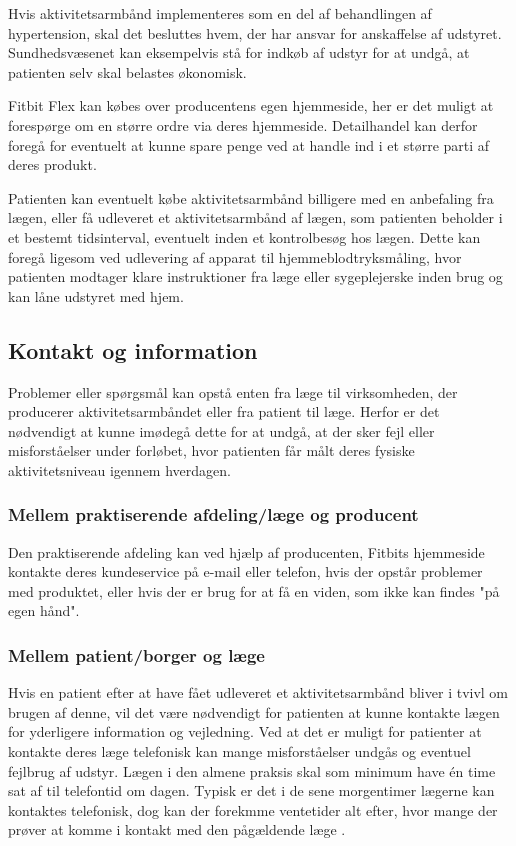Hvis aktivitetsarmbånd implementeres som en del af behandlingen af hypertension, skal det besluttes hvem, der har ansvar for anskaffelse af udstyret. Sundhedsvæsenet kan eksempelvis stå for indkøb af udstyr for at undgå, at patienten selv skal belastes økonomisk. 

Fitbit Flex kan købes over producentens egen hjemmeside, her er det muligt at forespørge om en større ordre via deres hjemmeside. Detailhandel kan derfor foregå for eventuelt at kunne spare penge ved at handle ind i et større parti af deres produkt.

Patienten kan eventuelt købe aktivitetsarmbånd billigere med en anbefaling fra lægen, eller få udleveret et aktivitetsarmbånd af lægen, som patienten beholder i et bestemt tidsinterval, eventuelt inden et kontrolbesøg hos lægen. Dette kan foregå ligesom ved udlevering af apparat til hjemmeblodtryksmåling, hvor patienten modtager klare instruktioner fra læge eller sygeplejerske inden brug og kan låne udstyret med hjem.

\subsection{Kontakt og information}

Problemer eller spørgsmål kan opstå enten fra læge til virksomheden, der producerer aktivitetsarmbåndet eller fra patient til læge. Herfor er det nødvendigt at kunne imødegå dette for at undgå, at der sker fejl eller misforståelser under forløbet, hvor patienten får målt deres fysiske aktivitetsniveau igennem hverdagen. 

\subsubsection{Mellem praktiserende afdeling/læge og producent}

Den praktiserende afdeling kan ved hjælp af producenten, Fitbits hjemmeside kontakte deres kundeservice på e-mail eller telefon, hvis der opstår problemer med produktet, eller hvis der er brug for at få en viden, som ikke kan findes "på egen hånd". 

\subsubsection{Mellem patient/borger og læge}

Hvis en patient efter at have fået udleveret et aktivitetsarmbånd bliver i tvivl om brugen af denne, vil det være nødvendigt for patienten at kunne kontakte lægen for yderligere information og vejledning. Ved at det er muligt for patienter at kontakte deres læge telefonisk kan mange misforståelser undgås og eventuel fejlbrug af udstyr. Lægen i den almene praksis skal som minimum have én time sat af til telefontid om dagen. Typisk er det i de sene morgentimer lægerne kan kontaktes telefonisk, dog kan der forekmme ventetider alt efter, hvor mange der prøver at komme i kontakt med den pågældende læge \citep{vedsted2005}. 

